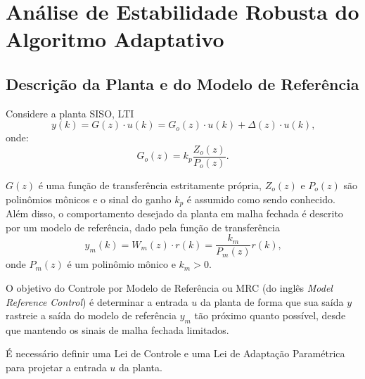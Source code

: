 
\chapter{Análise de Estabilidade Robusta do Algoritmo Adaptativo}\label{provas}


\section{Descrição da Planta e do Modelo de Referência}

    Considere a planta SISO, LTI
    \begin{equation}
        y(k) = G(z) \cdot u(k) = G_o(z) \cdot u(k) + \Delta(z) \cdot u(k)\text{,}
        \label{eq:saida_da_planta}
    \end{equation}
    onde:
    \begin{equation}
        G_o(z) = k_p \frac{Z_o(z)}{P_o(z)}\text{.}
    \end{equation}

    $G(z)$ é uma função de transferência estritamente própria, $Z_o(z)$ e $P_o(z)$
    são polinômios mônicos e o sinal do ganho $k_p$ é assumido como sendo conhecido. Além
    disso, o comportamento desejado da planta em malha fechada é descrito por um modelo de
    referência, dado pela função de transferência
    \begin{equation}
        y_m(k) = W_m(z) \cdot r(k) = \frac{k_m}{P_m(z)} r(k)\text{,}
        \label{eq:saida_do_modelo_de_referencia}
    \end{equation}
    onde $P_m(z)$ é um polinômio mônico e $k_m > 0$.

    O objetivo do Controle por Modelo de Referência ou MRC (do inglês \emph{Model
    Reference Control}) é determinar a entrada $u$ da planta de forma que sua saída
    $y$ rastreie a saída do modelo de referência $y_m$ tão próximo quanto possível,
    desde que mantendo os sinais de malha fechada limitados.

    É necessário definir uma Lei de Controle e uma Lei de Adaptação Paramétrica para
    projetar a entrada $u$ da planta.

